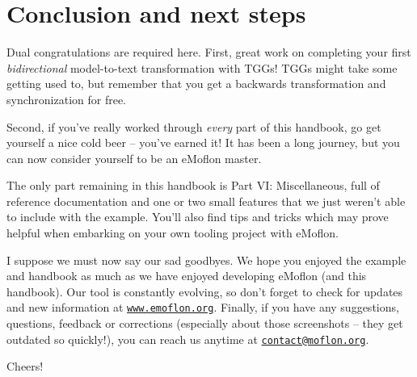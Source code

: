 \newpage
\section{Conclusion and next steps}
\genHeader

Dual congratulations are required here. First, great work on completing your first \emph{bidirectional} model-to-text transformation with TGGs! TGGs
might take some getting used to, but remember that you get a backwards transformation and synchronization for free.

Second, if you've really worked through \emph{every} part of this handbook, go get yourself a nice cold beer -- you've earned it! It
has been a long journey, but you can now consider yourself to be an eMoflon master.

The only part remaining in this handbook is Part VI: Miscellaneous, full of reference documentation and one or two small features that we just weren't able to
include with the example. You'll also find tips and tricks which may prove helpful when embarking on your own tooling project with eMoflon.

I suppose we must now say our sad goodbyes. We hope you enjoyed the example and handbook as much as we have enjoyed developing eMoflon (and this handbook). Our
tool is constantly evolving, so don't forget to check for updates and new information at \texttt{\url{www.emoflon.org}}. Finally, if you have any suggestions,
questions, feedback or corrections (especially about those screenshots -- they get outdated so quickly!), you can reach us anytime at
\texttt{\href{mailto:contact@moflon.org}{contact@moflon.org}}.

Cheers!
